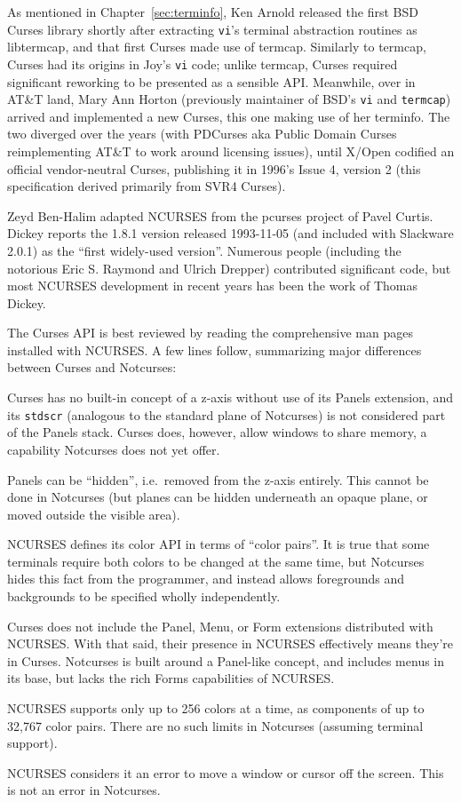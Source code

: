 As mentioned in Chapter~\ref{sec:terminfo}, Ken Arnold released the first BSD
Curses library shortly after extracting \texttt{vi}'s terminal abstraction routines
as libtermcap, and that first Curses made use of termcap\cite{cursesexplained}.
Similarly to termcap, Curses had its origins in Joy's \texttt{vi} code; unlike
termcap, Curses required significant reworking to be presented as a sensible
API. Meanwhile, over in AT\&T land, Mary Ann Horton (previously maintainer of
BSD's \texttt{vi} and \texttt{termcap}) arrived and implemented a new Curses,
this one making use of her terminfo. The two diverged over the years (with PDCurses
aka Public Domain Curses reimplementing AT\&T to work around licensing issues),
until X/Open codified an official vendor-neutral Curses, publishing it in
1996's Issue 4, version 2 (this specification derived primarily from SVR4 Curses).

Zeyd Ben-Halim adapted NCURSES from the pcurses project of Pavel Curtis. Dickey
reports the 1.8.1 version released 1993-11-05 (and included with Slackware 2.0.1)
as the ``first widely-used version''. Numerous people (including the notorious
Eric S. Raymond and Ulrich Drepper) contributed significant code, but most NCURSES
development in recent years has been the work of Thomas Dickey.

The Curses API is best reviewed by reading the comprehensive man pages installed
with NCURSES. A few lines follow, summarizing major differences between Curses and Notcurses:

\begin{denseitemize}
\item{Curses has no built-in concept of a z-axis without use of its Panels
    extension, and its \texttt{stdscr} (analogous to the standard plane of
    Notcurses) is not considered part of the Panels stack. Curses does, however,
    allow windows to share memory, a capability Notcurses does not yet offer.}
\item{Panels can be ``hidden'', i.e.\ removed from the z-axis entirely. This cannot
    be done in Notcurses (but planes can be hidden underneath an opaque plane,
    or moved outside the visible area).}
\item{NCURSES defines its color API in terms of ``color pairs''. It is true that some
    terminals require both colors to be changed at the same time, but Notcurses
    hides this fact from the programmer, and instead allows foregrounds and backgrounds
    to be specified wholly independently.}
\item{Curses does not include the Panel, Menu, or Form extensions distributed
    with NCURSES. With that said, their presence in NCURSES effectively means
    they're in Curses. Notcurses is built around a Panel-like concept, and
    includes menus in its base, but lacks the rich Forms capabilities of NCURSES.}
\item{NCURSES supports only up to 256 colors at a time, as components of up to
    32,767 color pairs. There are no such limits in Notcurses (assuming terminal support).}
\item{NCURSES considers it an error to move a window or cursor off the screen. This
    is not an error in Notcurses.}
\end{denseitemize}
